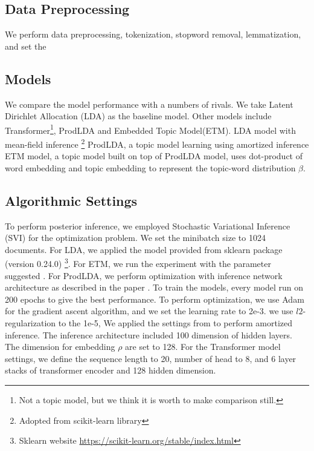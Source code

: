 \subsection{Data Preprocessing}
We perform data preprocessing, tokenization, stopword removal, lemmatization, and set the 
\subsection{Models}
We compare the model performance with a numbers of rivals. We take Latent Dirichlet Allocation (LDA)\cite{blei_latent_2003} as the baseline model. Other models include Transformer\cite{vaswani_attention_nodate}\footnote{Not a topic model, but we think it is worth to make comparison still.},  ProdLDA\cite{srivastava_autoencoding_2017} and Embedded Topic Model(ETM)\cite{dieng_topic_2019}.
LDA model with mean-field inference \footnote{Adopted from \textmd{scikit-learn} library}
ProdLDA, a topic model learning using amortized inference 
ETM model, a topic model built on top of ProdLDA model, uses dot-product of word embedding and topic embedding to represent the topic-word distribution $ \beta $.
\subsection{Algorithmic Settings}
To perform posterior inference, we employed Stochastic Variational Inference (SVI) \cite{hoffman_stochastic_2013} for the optimization problem. We set the minibatch size to 1024 documents.
For LDA, we applied the model provided from sklearn package (version 0.24.0) \footnote{Sklearn website \url{https://scikit-learn.org/stable/index.html}}. For ETM, we run the experiment with the parameter suggested \cite{dieng_topic_2019}. For ProdLDA, we perform optimization with inference network architecture as described in the paper \cite{srivastava_autoencoding_2017}. 
To train the models, every model run on 200 epochs to give the best performance. 
To perform optimization, we use Adam for the gradient ascent algorithm, and we set the learning rate to 2e-3.
we use $ l2 $-regularization to the 1e-5,
We applied the settings from \cite{srivastava_autoencoding_2017} to perform amortized inference. The inference architecture included 100 dimension of hidden layers. 
The dimension for embedding $ \rho $ are set to 128.
For the Transformer model settings, we define the sequence length to 20, number of head to 8, and 6 layer stacks of transformer encoder and 128 hidden dimension.
